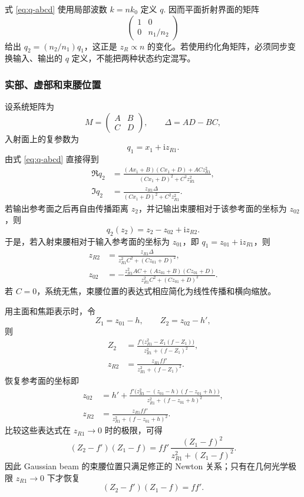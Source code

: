 式 \eqref{eq:q-abcd} 使用局部波数 \(k=nk_0\) 定义 \(q\). 因而平面折射界面的矩阵
\[
	\begin{pmatrix}1&0\\0&n_1/n_2\end{pmatrix}
\]
给出 \(q_2=(n_2/n_1)q_1\)，这正是 \(z_R\propto n\) 的变化。若使用约化角矩阵，必须同步变换输入、输出的 \(q\) 定义，不能把两种状态约定混写。

\subsubsection{实部、虚部和束腰位置}

设系统矩阵为
\begin{equation}
	M=
	\begin{pmatrix}A&B\\C&D\end{pmatrix},
\qquad \Delta=AD-BC,
\end{equation}
入射面上的复参数为
\[
	q_1=x_1+\mathrm i z_{R1}.
\]
由式 \eqref{eq:q-abcd} 直接得到
\begin{align}
	\Re q_2&=
	\frac{(Ax_1+B)(Cx_1+D)+ACz_{R1}^2}
	{(Cx_1+D)^2+C^2z_{R1}^2},\\
\Im q_2&=
	\frac{z_{R1}\Delta}
	{(Cx_1+D)^2+C^2z_{R1}^2}.
\end{align}
若输出参考面之后再自由传播距离 \(z_2\)，并记输出束腰相对于该参考面的坐标为 \(z_{02}\)，则
\begin{equation}
	q_2(z_2)=z_2-z_{02}+\mathrm i z_{R2}.
\end{equation}
于是，若入射束腰相对于输入参考面的坐标为 \(z_{01}\)，即 \(q_1=z_{01}+\mathrm i z_{R1}\)，则
\begin{align}
	z_{R2}
	&=\frac{z_{R1}\Delta}
	{z_{R1}^2C^2+(Cz_{01}+D)^2},\\
	z_{02}
	&=-\frac{z_{R1}^2AC+(Az_{01}+B)(Cz_{01}+D)}
	{z_{R1}^2C^2+(Cz_{01}+D)^2}.
\end{align}
若 \(C=0\)，系统无焦，束腰位置的表达式相应简化为线性传播和横向缩放。

用主面和焦距表示时，令
\[
	Z_1=z_{01}-h,\qquad Z_2=z_{02}-h',
\]
则
\begin{align}
	Z_2&=
	\frac{f'\bigl(z_{R1}^2-Z_1(f-Z_1)\bigr)}
	{z_{R1}^2+(f-Z_1)^2},\\
	z_{R2}&=
	\frac{z_{R1}ff'}
	{z_{R1}^2+(f-Z_1)^2}.
\end{align}
恢复参考面的坐标即
\begin{align}
	z_{02}&=h'
	+\frac{f'\bigl(z_{R1}^2-(z_{01}-h)(f-z_{01}+h)\bigr)}
	{z_{R1}^2+(f-z_{01}+h)^2},\\
	z_{R2}&=
	\frac{z_{R1}ff'}
	{z_{R1}^2+(f-z_{01}+h)^2}.
\end{align}
比较这些表达式在 \(z_{R1}\to0\) 时的极限，可得
\begin{equation}
	(Z_2-f')(Z_1-f)
	=
	ff'\,
	\frac{(Z_1-f)^2}{z_{R1}^2+(Z_1-f)^2}.
\end{equation}
因此 Gaussian beam 的束腰位置只满足修正的 Newton 关系；只有在几何光学极限 \(z_{R1}\to0\) 下才恢复
\[
	(Z_2-f')(Z_1-f)=ff'.
\]

